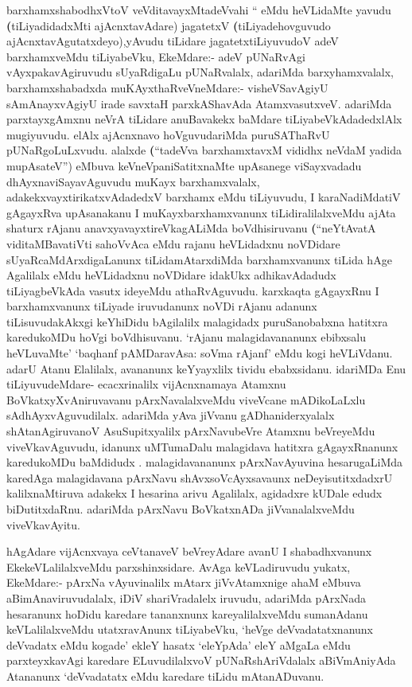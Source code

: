 \begin{artha}
barxhamxshabodhxVtoV veVditavayxMtadeVvahi `` eMdu heVLidaMte yavudu
\textbf(tiLiyadidadxMti ajAcnxtavAdare) jagatetxV \textbf(tiLiyadehovguvudo
ajAcnxtavAgutatxdeyo),yAvudu tiLidare jagatetxtiLiyuvudoV adeV
barxhamxveMdu tiLiyabeVku, EkeMdare:- adeV pUNaRvAgi
vAyxpakavAgiruvudu sUyaRdigaLu pUNaRvalalx, adariMda barxyhamxvalalx,
barxhamxshabadxda muKAyxthaRveVneMdare:- visheVSavAgiyU sAmAnayxvAgiyU
irade savxtaH parxkAShavAda AtamxvasutxveV. adariMda parxtayxgAmxnu
neVrA tiLidare anuBavakekx baMdare tiLiyabeVkAdadedxlAlx
mugiyuvudu. elAlx ajAcnxnavo hoVguvudariMda puruSAThaRvU
pUNaRgoLuLxvudu. alalxde \textbf(``tadeVva barxhamxtavxM vididhx
neVdaM yadida mupAsateV'') eMbuva keVneVpaniSatitxnaMte upAsanege
viSayxvadadu dhAyxnaviSayavAguvudu muKayx barxhamxvalalx,
adakekxvayxtirikatxvAdadedxV barxhamx eMdu tiLiyuvudu, I
karaNadiMdatiV gAgayxRva upAsanakanu I muKayxbarxhamxvanunx
tiLidiralilalxveMdu ajAta shaturx rAjanu anavxyavayxtireVkagALiMda
boVdhisiruvanu \textbf(``neYtAvatA viditaMBavatiVti sahoVvAca eMdu
rajanu heVLidadxnu noVDidare sUyaRcaMdArxdigaLanunx tiLidamAtarxdiMda
barxhamxvanunx tiLida hAge Agalilalx eMdu heVLidadxnu noVDidare
idakUkx adhikavAdadudx tiLiyagbeVkAda vasutx ideyeMdu athaRvAguvudu.
karxkaqta gAgayxRnu I barxhamxvanunx tiLiyade iruvudanunx noVDi
rAjanu adanunx tiLisuvudakAkxgi keYhiDidu bAgilalilx malagidadx
puruSanobabxna hatitxra karedukoMDu hoVgi boVdhisuvanu. `rAjanu
malagidavananunx ebibxsalu heVLuvaMte' `baqhanf pAMDaravAsa: soVma
rAjanf' eMdu kogi heVLiVdanu. adarU Atanu Elalilalx, avananunx
keYyayxlilx tividu ebabxsidanu. idariMDa Enu tiLiyuvudeMdare-
ecacxrinalilx vijAcnxnamaya Atamxnu BoVkatxyXvAniruvavanu
pArxNavalalxveMdu viveVcane mADikoLaLxlu sAdhAyxvAguvudilalx. adariMda
yAva jiVvanu gADhaniderxyalalx shAtanAgiruvanoV AsuSupitxyalilx
pArxNavubeVre Atamxnu beVreyeMdu viveVkavAguvudu, idanunx uMTumaDalu
malagidava hatitxra  gAgayxRnanunx karedukoMDu baMdidudx
. malagidavananunx pArxNavAyuvina hesarugaLiMda karedAga malagidavana
pArxNavu shAvxsoVcAyxsavaunx neDeyisutitxdadxrU kalilxnaMtiruva
adakekx I hesarina arivu Agalilalx, agidadxre kUDale edudx
biDutitxdaRnu. adariMda pArxNavu BoVkatxnADa jiVvanalalxveMdu
viveVkavAyitu.
\end{artha}

\begin{artha}
hAgAdare vijAcnxvaya ceVtanaveV beVreyAdare avanU I shabadhxvanunx
EkekeVLalilalxveMdu parxshinxsidare. AvAga keVLadiruvudu yukatx,
EkeMdare:- pArxNa vAyuvinalilx mAtarx jiVvAtamxnige ahaM eMbuva
aBimAnaviruvudalalx, iDiV shariVradalelx iruvudu, adariMda pArxNada
hesaranunx hoDidu karedare tananxnunx kareyalilalxveMdu sumanAdanu
keVLalilalxveMdu utatxravAnunx tiLiyabeVku, `heVge deVvadatatxnanunx
deVvadatx eMdu kogade' ekleY hasatx `eleYpAda' eleY aMgaLa eMdu
parxteyxkavAgi karedare ELuvudilalxvoV pUNaRshAriVdalalx aBiVmAniyAda
Atananunx `deVvadatatx eMdu karedare tiLidu mAtanADuvanu. 
\end{artha}

